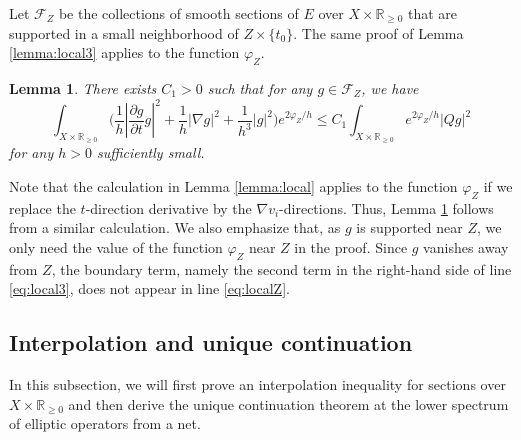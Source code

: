 \documentclass[12pt, reqno]{amsart}
\theoremstyle{plain}%
\newtheorem{lemma}[theorem]{Lemma}
\theoremstyle{definition}
\theoremstyle{remark}
\numberwithin{equation}{section}
\newcommand{\R}{\mathbb{R}}
\begin{document}
Let $\mathcal F_Z$ be the collections of smooth sections of $E$ over $X\times\R_{\geq 0}$ that are supported in a small neighborhood of  $Z\times\{t_0\}$. The same proof of Lemma \ref{lemma:local3} applies to the function $\varphi_Z$.
\begin{lemma}\label{lemma:localZ}
	There exists $C_1>0$ such that for any $g\in\mathcal F_Z$, we have
	\begin{equation} \label{eq:localZ}
		\int_{X\times\R_{\geq 0}}\Big(\frac 1 h|\frac{\partial g}{\partial t}g|^2+\frac 1 h|\nabla g|^2+\frac{1}{h^3}|g|^2 \Big)e^{2\varphi_Z/h} \leq C_1\int_{X\times\R_{\geq 0}}e^{2\varphi_Z/h}|Qg|^2
	\end{equation}
	for any $h>0$ sufficiently small.
\end{lemma}
Note that the calculation in Lemma \ref{lemma:local} applies to the function $\varphi_Z$ if we replace the $t$-direction derivative by the $\nabla v_i$-directions. Thus,  Lemma \ref{lemma:localZ} follows from a similar calculation. We also emphasize that, as $g$ is supported near $Z$, we only need the value of the function $\varphi_Z$ near $Z$ in the proof. Since $g$ vanishes away from $Z$, the boundary term, namely the second term in the right-hand side of line \eqref{eq:local3}, does not appear in line \eqref{eq:localZ}.
\subsection{Interpolation and unique continuation}

In this subsection, we will first prove an interpolation inequality for sections over $X\times\R_{\geq 0}$ and then derive the unique continuation theorem at the lower spectrum of elliptic operators from a net.
\end{document}

